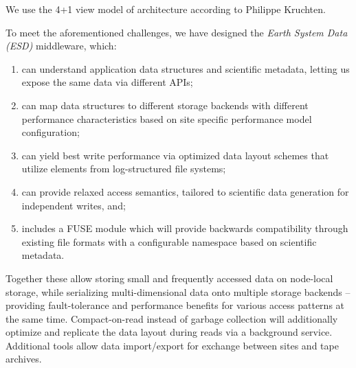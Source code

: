 \documentclass{../../template/esiwace-report}
\begin{document}
\begin{chapterIntro}
We use the 4+1 view model of architecture according to Philippe Kruchten. 




To meet the aforementioned challenges, we have designed the \textit{Earth System Data (ESD)} middleware, which:


\begin{enumerate}
	\item can understand application data structures and scientific metadata, letting us expose the same data via different APIs;
	\item can map data structures to different storage backends with different performance characteristics based on site specific performance model configuration;
	\item can yield best write performance via optimized data layout schemes that utilize elements from log-structured file systems;
	\item can provide relaxed access semantics, tailored to scientific data generation for independent writes, and;
	\item 
includes a FUSE module which will provide backwards compatibility through existing file formats with a configurable namespace based on scientific metadata.
\end{enumerate}



Together these allow storing small and frequently accessed data on node-local storage, while serializing multi-dimensional data onto multiple storage backends -- providing fault-tolerance and performance benefits for various access patterns at the same time.  Compact-on-read instead of garbage collection will additionally optimize and replicate the data layout during reads via a background service. Additional tools allow data import/export for exchange between sites and tape archives.
\end{chapterIntro}
\end{document}
